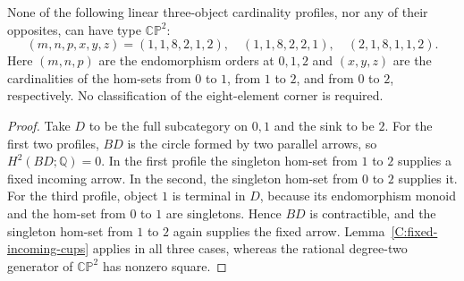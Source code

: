 \begin{corollary}
\label{C:fifteen-extreme-eight}
None of the following linear three-object cardinality profiles, nor
any of their opposites, can have type $\mathbb{CP}^2$:
\[
 (m,n,p,x,y,z)=(1,1,8,2,1,2),\quad
 (1,1,8,2,2,1),\quad (2,1,8,1,1,2).
\]
Here $(m,n,p)$ are the endomorphism orders at $0,1,2$ and
$(x,y,z)$ are the cardinalities of the hom-sets from $0$ to $1$,
from $1$ to $2$, and from $0$ to $2$, respectively.
No classification of the eight-element corner is required.
\end{corollary}
\begin{proof}
Take $D$ to be the full subcategory on $0,1$ and the sink to be $2$.
For the first two profiles, $BD$ is the circle formed by two parallel
arrows, so $H^2(BD;\mathbb Q)=0$.  In the first profile the singleton
hom-set from $1$ to $2$ supplies a fixed incoming arrow.  In the second,
the singleton hom-set from $0$ to $2$ supplies it.  For the third profile,
object $1$ is terminal in $D$, because its endomorphism monoid and the
hom-set from $0$ to $1$ are singletons.  Hence $BD$ is contractible, and
the singleton hom-set from $1$ to $2$ again supplies the fixed arrow.
Lemma~\ref{C:fixed-incoming-cups} applies in all three cases, whereas
the rational degree-two generator of $\mathbb{CP}^2$ has nonzero square.
\end{proof}
